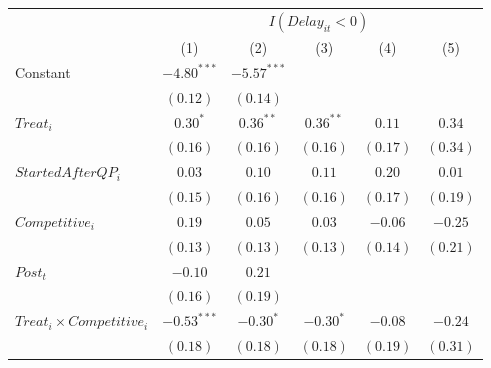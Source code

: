 \documentclass[
]{article}
\begin{document}
\begin{table}
\begin{center}
\begin{tabular}{l c c c c c}
\hline
 & \multicolumn{5}{c}{$I(Delay_{it}<0)$} \\
\cline{2-6}
 & (1) & (2) & (3) & (4) & (5) \\
\hline
Constant                                                             & $-4.80^{***}$ & $-5.57^{***}$ &             &             &              \\
                                                                     & $(0.12)$      & $(0.14)$      &             &             &              \\
$Treat_i$                                                            & $0.30^{*}$    & $0.36^{**}$   & $0.36^{**}$ & $0.11$      & $0.34$       \\
                                                                     & $(0.16)$      & $(0.16)$      & $(0.16)$    & $(0.17)$    & $(0.34)$     \\
$StartedAfterQP_i$                                                   & $0.03$        & $0.10$        & $0.11$      & $0.20$      & $0.01$       \\
                                                                     & $(0.15)$      & $(0.16)$      & $(0.16)$    & $(0.17)$    & $(0.19)$     \\
$Competitive_i$                                                      & $0.19$        & $0.05$        & $0.03$      & $-0.06$     & $-0.25$      \\
                                                                     & $(0.13)$      & $(0.13)$      & $(0.13)$    & $(0.14)$    & $(0.21)$     \\
$Post_t$                                                             & $-0.10$       & $0.21$        &             &             &              \\
                                                                     & $(0.16)$      & $(0.19)$      &             &             &              \\
$Treat_i \times Competitive_i$                                       & $-0.53^{***}$ & $-0.30^{*}$   & $-0.30^{*}$ & $-0.08$     & $-0.24$      \\
                                                                     & $(0.18)$      & $(0.18)$      & $(0.18)$    & $(0.19)$    & $(0.31)$     \\

\end{tabular}
\end{center}
\end{table}
\end{document}
